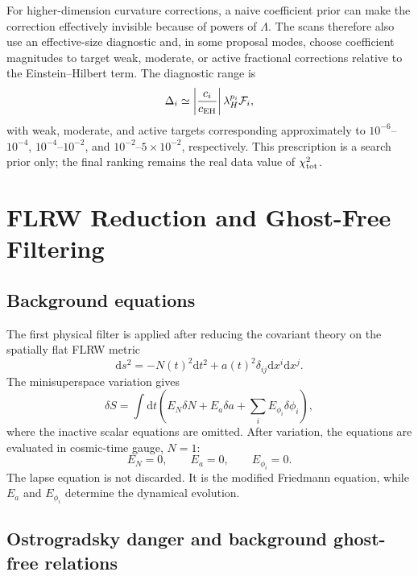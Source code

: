 \documentclass[aps,prd,twocolumn,superscriptaddress,nofootinbib,longbibliography]{revtex4-2}
\newcommand{\dd}{\mathrm{d}}
\newcommand{\Lam}{\Lambda}
\newcommand{\chiT}{\chi^2_{\rm tot}}
\begin{document}
For higher-dimension curvature corrections, a naive coefficient prior can make the correction effectively invisible because of powers of $\Lam$.  The scans therefore also use an effective-size diagnostic and, in some proposal modes, choose coefficient magnitudes to target weak, moderate, or active fractional corrections relative to the Einstein--Hilbert term.  The diagnostic range is
\begin{equation}
\Delta_i\simeq
\left|\frac{c_i}{c_{\rm EH}}\right|\lambda_H^{p_i}{\cal F}_i ,
\label{eq:delta-prior}
\end{equation}
with weak, moderate, and active targets corresponding approximately to $10^{-6}$--$10^{-4}$, $10^{-4}$--$10^{-2}$, and $10^{-2}$--$5\times10^{-2}$, respectively.  This prescription is a search prior only; the final ranking remains the real data value of $\chiT$.

\section{FLRW Reduction and Ghost-Free Filtering}
\label{sec:ghost}

\subsection{Background equations}
\label{subsec:background-eom}

The first physical filter is applied after reducing the covariant theory on the spatially flat FLRW metric
\begin{equation}
\dd s^2=-N(t)^2\dd t^2+a(t)^2\delta_{ij}\dd x^i\dd x^j .
\label{eq:flrw}
\end{equation}
The minisuperspace variation gives
\begin{equation}
\delta S=\int \dd t\left(E_N\delta N+E_a\delta a+\sum_iE_{\phi_i}\delta\phi_i\right),
\label{eq:variation}
\end{equation}
where the inactive scalar equations are omitted.  After variation, the equations are evaluated in cosmic-time gauge, $N=1$:
\begin{equation}
E_N=0,\qquad E_a=0,\qquad E_{\phi_i}=0 .
\label{eq:eom-set}
\end{equation}
The lapse equation is not discarded.  It is the modified Friedmann equation, while $E_a$ and $E_{\phi_i}$ determine the dynamical evolution.

\subsection{Ostrogradsky danger and background ghost-free relations}
\label{subsec:ostro}
\end{document}
